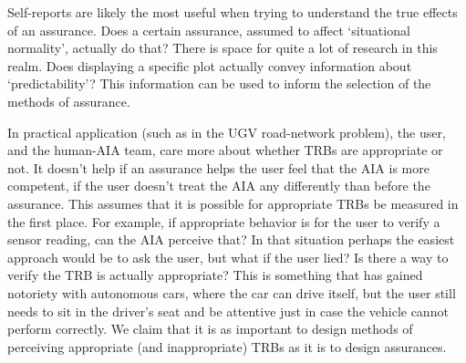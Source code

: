     Self-reports are likely the most useful when trying to understand the true effects of an assurance. Does a certain assurance, assumed to affect `situational normality', actually do that? There is space for quite a lot of research in this realm. Does displaying a specific plot actually convey  information about `predictability'? This information can be used to inform the selection of the methods of assurance.

    In practical application (such as in the UGV road-network problem), the user, and the human-AIA team, care more about whether TRBs are appropriate or not. It doesn't help if an assurance helps the user feel that the AIA is more competent, if the user doesn't treat the AIA any differently than before the assurance. This assumes that it is possible for appropriate TRBs be measured in the first place. For example, if appropriate behavior is for the user to verify a sensor reading, can the AIA perceive that? In that situation perhaps the easiest approach would be to ask the user, but what if the user lied? Is there a way to verify the TRB is actually appropriate? This is something that has gained notoriety with autonomous cars, where the car can drive itself, but the user still needs to sit in the driver's seat and be attentive just in case the vehicle cannot perform correctly. We claim that it is as important to design methods of perceiving appropriate (and inappropriate) TRBs as it is to design assurances. 
%
%
%
